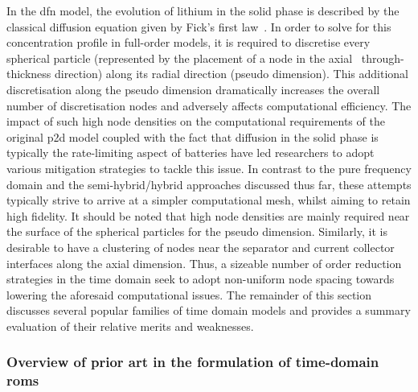 In the \gls{dfn} model, the evolution of lithium in the solid phase is described
by the classical  diffusion equation given by  Fick's first law~\cite{Fick1995}.
In order  to solve for  this concentration profile  in full-order models,  it is
required to discretise every spherical particle (represented by the placement of
a  node  in  the  axial  \ie~through-thickness  direction)  along  its  radial
direction (pseudo  dimension). This  additional discretisation along  the pseudo
dimension dramatically increases the overall  number of discretisation nodes and
adversely  affects  computational  efficiency.  The impact  of  such  high  node
densities  on the  computational requirements  of the  original \gls{p2d}  model
coupled  with the  fact  that diffusion  in  the solid  phase  is typically  the
rate-limiting  aspect  of  batteries  have  led  researchers  to  adopt  various
mitigation strategies  to tackle this issue.  In contrast to the  pure frequency
domain and the semi-hybrid/hybrid approaches  discussed thus far, these attempts
typically strive  to arrive at  a simpler  computational mesh, whilst  aiming to
retain high  fidelity. It should  be noted that  high node densities  are mainly
required near the  surface of the spherical particles for  the pseudo dimension.
Similarly, it is desirable to have a clustering  of nodes near the  separator
and current collector interfaces along the axial dimension. Thus, a sizeable
number  of order reduction strategies in the time  domain seek to adopt
non-uniform node  spacing towards lowering the aforesaid computational issues.
The remainder of  this  section discusses  several  popular  families  of time
domain  models and  provides a  summary evaluation  of  their relative  merits
and  weaknesses.

\subsubsection*{Overview of prior art in the formulation of time-domain \glspl{rom}}


